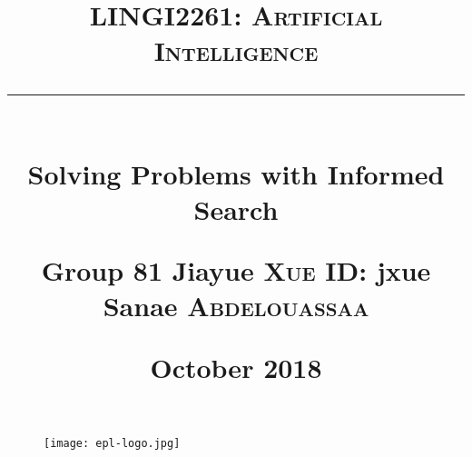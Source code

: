 \documentclass[12pt, a4paper]{report}
\title{
    \vspace{0.5cm} \textcolor{db}{\textsc{LINGI2261: Artificial Intelligence}} \\
    \vspace{0.5 cm} \rule{10 cm}{0.5pt} \\
    \vspace{0.5 cm} \Large{Solving Problems with Informed Search} \\
    \vspace{5 cm}
    \begin{flushright}
        \large
        Group 81
        Jiayue \textsc{Xue} ID: jxue\\
        Sanae \textsc{Abdelouassaa} \\     
    \end{flushright}
    \vspace{0.5 cm}
    \begin{flushright}
        \normalsize \nth{24} October 2018 \\
    \end{flushright}
}
\author{}
\date{}
\begin{document}
\begin{figure}[t]
    \hspace{10 cm} \texttt{[image: epl-logo.jpg]}
\end{figure}

\maketitle

\tableofcontents
\end{document}
